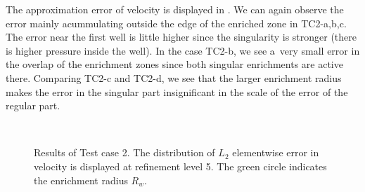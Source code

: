 The approximation error of velocity is displayed in . We can again observe
the error mainly acummulating outside the edge of the enriched zone in TC2-a,b,c.
The error near the first well is little higher since the singularity is stronger (there is higher pressure inside the well).
In the case TC2-b, we see a~very small error in the overlap of the enrichment zones
since both singular enrichments are active there.
Comparing TC2-c and TC2-d, we see that the larger enrichment radius makes the error in the singular part insignificant
in the scale of the error of the regular part.

%
\begin{figure}[!htb]
    \centering
     \\
    \caption[Error distribution in Test case 2.]
    {Results of Test case 2. The distribution of $L_2$ elementwise error in velocity is displayed at refinement level 5.
    The green circle indicates the enrichment radius $R_w$. }
    \label{fig:mh_tc2_error}
\end{figure}
%

